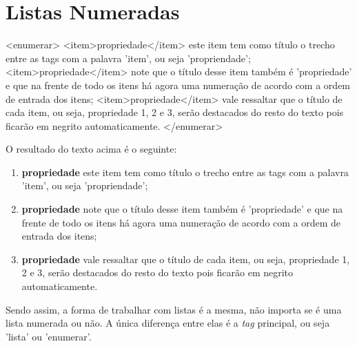 \section{Listas Numeradas}\setcounter{SteP}{1}

\begin{BoxVerbatim}
    <enumerar>
        <item>propriedade</item> este item tem como título o trecho entre
            as tags com a palavra 'item', ou seja 'propriendade';
        <item>propriedade</item> note que o título desse item também é 
            'propriedade' e que na frente de todo os itens há agora uma 
            numeração de acordo com a ordem de entrada dos itens;
        <item>propriedade</item> vale ressaltar que o título de cada item, 
            ou seja, propriedade 1, 2 e 3, serão destacados do resto do 
            texto pois ficarão em negrito automaticamente.
    </enumerar>
\end{BoxVerbatim}

O resultado do texto acima é o seguinte:

\begin{enumerate}
	\item{\bf propriedade} este item tem como título o trecho entre as tags
							com a palavra 'item', ou seja 'propriendade';
	\item{\bf propriedade} note que o título desse item também é
							'propriedade' e que na frente de todo os itens há
							agora uma numeração de acordo com a ordem de
							entrada dos itens;
	\item{\bf propriedade} vale ressaltar que o título de cada item, ou
							seja, propriedade 1, 2 e 3, serão destacados do
							resto do texto pois ficarão em negrito
							automaticamente.
\end{enumerate}


Sendo assim, a forma de trabalhar com listas é a mesma, não importa se é uma
lista numerada ou não. A única diferença entre elas é a {\it tag} principal,
ou seja 'lista' ou 'enumerar'.
